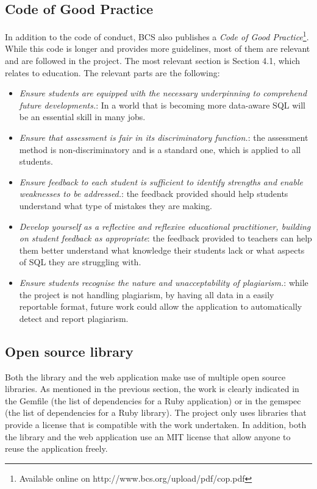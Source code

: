 \subsection{Code of Good Practice}

In addition to the code of conduct, BCS also publishes a \textit{Code of Good Practice}\footnote{Available online on http://www.bcs.org/upload/pdf/cop.pdf}. While this code is longer and provides more guidelines, most of them are relevant and are followed in the project. The most relevant section is Section 4.1, which relates to education. The relevant parts are the following:

\begin{itemize}
    \item \textit{Ensure students are equipped with the necessary underpinning to comprehend future developments.}: In a world that is becoming more data-aware SQL will be an essential skill in many jobs.
    \item \textit{Ensure that assessment is fair in its discriminatory function.}: the assessment method is non-discriminatory and is a standard one, which is applied to all students.
    \item \textit{Ensure feedback to each student is sufficient to identify strengths and enable weaknesses to be addressed.}: the feedback provided should help students understand what type of mistakes they are making.
    \item \textit{Develop yourself as a reflective and reflexive educational practitioner, building on student feedback as appropriate}: the feedback provided to teachers can help them better understand what knowledge their students lack or what aspects of SQL they are struggling with.
    \item \textit{Ensure students recognise the nature and unacceptability of plagiarism.}: while the project is not handling plagiarism, by having all data in a easily reportable format, future work could allow the application to automatically detect and report plagiarism.
\end{itemize}

\subsection{Open source library}

Both the library and the web application make use of multiple open source libraries. As mentioned in the previous section, the work is clearly indicated in the Gemfile (the list of dependencies for a Ruby application) or in the gemspec (the list of dependencies for a Ruby library). The project only uses libraries that provide a license that is compatible with the work undertaken. In addition, both the library and the web application use an MIT license that allow anyone to reuse the application freely.
